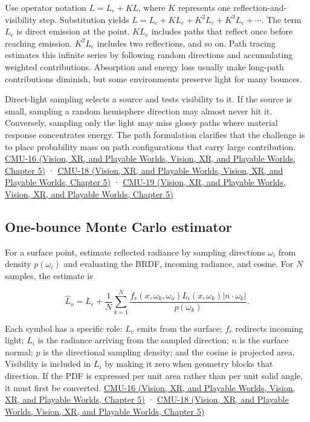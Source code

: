 Use operator notation \(L=L_e+KL\), where \(K\) represents one reflection-and-visibility step. Substitution yields \(L=L_e+KL_e+K^2L_e+K^3L_e+\cdots\). The term \(L_e\) is direct emission at the point. \(KL_e\) includes paths that reflect once before reaching emission. \(K^2L_e\) includes two reflections, and so on. Path tracing estimates this infinite series by following random directions and accumulating weighted contributions. Absorption and energy loss usually make long-path contributions diminish, but some environments preserve light for many bounces.

Direct-light sampling selects a source and tests visibility to it. If the source is small, sampling a random hemisphere direction may almost never hit it. Conversely, sampling only the light may miss glossy paths where material response concentrates energy. The path formulation clarifies that the challenge is to place probability mass on path configurations that carry large contribution. \href{../07-Vision-XR-and-Playable-Worlds/main.pdf\#nameddest=04-visual-computing-ii-ch036-cmu-16---the-rendering-equation}{CMU-16 (Vision, XR, and Playable Worlds, Vision, XR, and Playable Worlds, Chapter 5)} · \href{../07-Vision-XR-and-Playable-Worlds/main.pdf\#nameddest=04-visual-computing-ii-ch036-cmu-18---monte-carlo-rendering}{CMU-18 (Vision, XR, and Playable Worlds, Vision, XR, and Playable Worlds, Chapter 5)} · \href{../07-Vision-XR-and-Playable-Worlds/main.pdf\#nameddest=04-visual-computing-ii-ch036-cmu-19---variance-reduction}{CMU-19 (Vision, XR, and Playable Worlds, Vision, XR, and Playable Worlds, Chapter 5)}

\subsection{One-bounce Monte Carlo estimator}\label{03-visual-computing-i-ch011-one-bounce-monte-carlo-estimator}

For a surface point, estimate reflected radiance by sampling directions \(\omega_i\) from density \(p(\omega_i)\) and evaluating the BRDF, incoming radiance, and cosine. For \(N\) samples, the estimate is

\[
\widehat L_o=L_e+\frac1N\sum_{k=1}^N\frac{f_r(x,\omega_k,\omega_o)L_i(x,\omega_k)|n\cdot\omega_k|}{p(\omega_k)}.
\]

Each symbol has a specific role: \(L_e\) emits from the surface; \(f_r\) redirects incoming light; \(L_i\) is the radiance arriving from the sampled direction; \(n\) is the surface normal; \(p\) is the directional sampling density; and the cosine is projected area. Visibility is included in \(L_i\) by making it zero when geometry blocks that direction. If the PDF is expressed per unit area rather than per unit solid angle, it must first be converted. \href{../07-Vision-XR-and-Playable-Worlds/main.pdf\#nameddest=04-visual-computing-ii-ch036-cmu-16---the-rendering-equation}{CMU-16 (Vision, XR, and Playable Worlds, Vision, XR, and Playable Worlds, Chapter 5)} · \href{../07-Vision-XR-and-Playable-Worlds/main.pdf\#nameddest=04-visual-computing-ii-ch036-cmu-18---monte-carlo-rendering}{CMU-18 (Vision, XR, and Playable Worlds, Vision, XR, and Playable Worlds, Chapter 5)}

